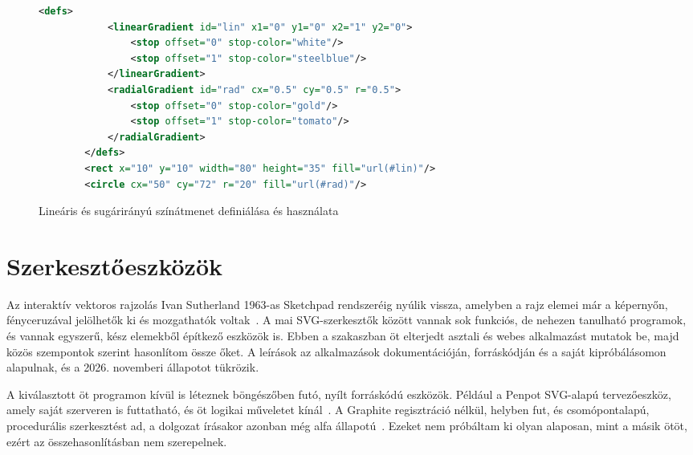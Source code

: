 \begin{figure}[H] \centering
    \begin{adjustbox}{valign=m, max width=0.8\textwidth}
        \begin{lstlisting}[language=XML]
        <defs>
            <linearGradient id="lin" x1="0" y1="0" x2="1" y2="0">
                <stop offset="0" stop-color="white"/>
                <stop offset="1" stop-color="steelblue"/>
            </linearGradient>
            <radialGradient id="rad" cx="0.5" cy="0.5" r="0.5">
                <stop offset="0" stop-color="gold"/>
                <stop offset="1" stop-color="tomato"/>
            </radialGradient>
        </defs>
        <rect x="10" y="10" width="80" height="35" fill="url(#lin)"/>
        <circle cx="50" cy="72" r="20" fill="url(#rad)"/>
        \end{lstlisting}
    \end{adjustbox}
    \hfill
    \begin{adjustbox}{valign=m, max width=0.2\textwidth}
        
    \end{adjustbox}
    \caption{Lineáris és sugárirányú színátmenet definiálása és használata}
    \label{fig:example_gradient}
\end{figure}

\section{Szerkesztőeszközök}
\label{sec:svg_editors}

Az interaktív vektoros rajzolás Ivan Sutherland 1963-as Sketchpad rendszeréig nyúlik vissza, amelyben a rajz elemei már a képernyőn, fényceruzával jelölhetők ki és mozgathatók voltak~\cite{sutherland1963}. A mai SVG-szerkesztők között vannak sok funkciós, de nehezen tanulható programok, és vannak egyszerű, kész elemekből építkező eszközök is. Ebben a szakaszban öt elterjedt asztali és webes alkalmazást mutatok be, majd közös szempontok szerint hasonlítom össze őket. A leírások az alkalmazások dokumentációján, forráskódján és a saját kipróbálásomon alapulnak, és a 2026. novemberi állapotot tükrözik.

A kiválasztott öt programon kívül is léteznek böngészőben futó, nyílt forráskódú eszközök. Például a Penpot SVG-alapú tervezőeszköz, amely saját szerveren is futtatható, és öt logikai műveletet kínál~\cite{penpot}. A Graphite regisztráció nélkül, helyben fut, és csomópontalapú, procedurális szerkesztést ad, a dolgozat írásakor azonban még alfa állapotú~\cite{graphite}. Ezeket nem próbáltam ki olyan alaposan, mint a másik ötöt, ezért az összehasonlításban nem szerepelnek.

